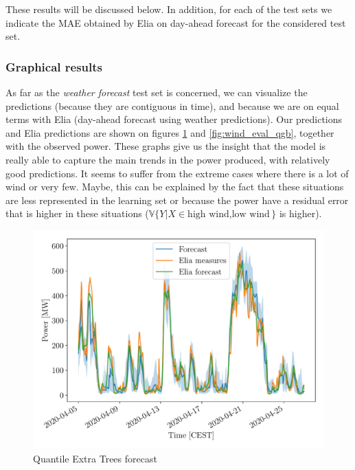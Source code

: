 \documentclass[a4paper, 12pt]{article}
\begin{document}
	These results will be discussed below. In addition, for each of the test sets we indicate the MAE obtained by Elia on day-ahead forecast for the considered test set.

	\subsubsection{Graphical results}
	As far as the \emph{weather forecast} test set is concerned, we can visualize the predictions (because they are contiguous in time), and because we are on equal terms with Elia (day-ahead forecast using weather predictions). Our predictions and Elia predictions are shown on figures \ref{fig:wind_eval_qxt} and \ref{fig:wind_eval_qgb}, together with the observed power. These graphs give us the insight that the model is really able to capture the main trends in the power produced, with relatively good predictions. It seems to suffer from the extreme cases where there is a lot of wind or very few. Maybe, this can be explained by the fact that these situations are less represented in the learning set or because the power have a residual error that is higher in these situations ($\mathbb{V}\{Y|X \in {\text{high wind}, \text{low wind}}\}$ is higher). 
	
	\begin{figure}
		\centering
		\includegraphics[width=.8\textwidth]{resources/pdf/wind_eval_qxt.pdf}
		\vspace{-1em}
		\caption{Quantile Extra Trees forecast}
		\label{fig:wind_eval_qxt}
	\end{figure}
	
\end{document}
